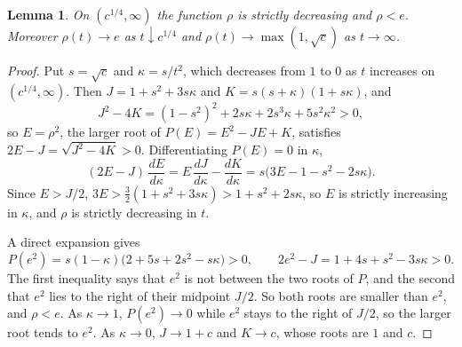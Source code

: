 \documentclass[11pt]{amsart}
\newtheorem{lem}[thm]{Lemma}
\theoremstyle{remark}
\numberwithin{equation}{section}
\begin{document}
\begin{lem}\label{lem:below}
On $(c^{1/4},\infty)$ the function $\rho$ is strictly decreasing and $\rho<e$. Moreover $\rho(t)\to e$ as $t\downarrow c^{1/4}$ and $\rho(t)\to\max(1,\sqrt c)$ as $t\to\infty$.
\end{lem}

\begin{proof}
Put $s=\sqrt c$ and $\kappa =s/t^2$, which decreases from $1$ to $0$ as $t$ increases on $(c^{1/4},\infty)$. Then $J=1+s^2+3s\kappa$ and $K=s(s+\kappa)(1+s\kappa)$, and
\[
J^2-4K=(1-s^2)^2+2s\kappa+2s^3\kappa+5s^2\kappa^2>0,
\]
so $E=\rho^2$, the larger root of $P(E)=E^2-JE+K$, satisfies $2E-J=\sqrt{J^2-4K}>0$. Differentiating $P(E)=0$ in $\kappa$,
\[
(2E-J)\,\frac{dE}{d\kappa}=E\,\frac{dJ}{d\kappa}-\frac{dK}{d\kappa}=s\bigl(3E-1-s^2-2s\kappa\bigr).
\]
Since $E>J/2$, $3E>\tfrac32(1+s^2+3s\kappa)>1+s^2+2s\kappa$, so $E$ is strictly increasing in $\kappa$, and $\rho$ is strictly decreasing in $t$.

A direct expansion gives
\[
P(e^2)=s(1-\kappa)\bigl(2+5s+2s^2-s\kappa\bigr)>0,\qquad 2e^2-J=1+4s+s^2-3s\kappa>0 .
\]
The first inequality says that $e^2$ is not between the two roots of $P$, and the second that $e^2$ lies to the right of their midpoint $J/2$. So both roots are smaller than $e^2$, and $\rho<e$. As $\kappa \to1$, $P(e^2)\to0$ while $e^2$ stays to the right of $J/2$, so the larger root tends to $e^2$. As $\kappa \to0$, $J\to1+c$ and $K\to c$, whose roots are $1$ and $c$.
\end{proof}
\end{document}
